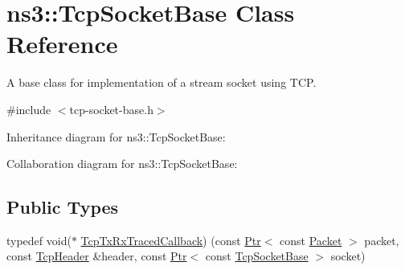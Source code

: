 \hypertarget{classns3_1_1TcpSocketBase}{}\section{ns3\+:\+:Tcp\+Socket\+Base Class Reference}
\label{classns3_1_1TcpSocketBase}


A base class for implementation of a stream socket using T\+CP.  




{\ttfamily \#include $<$tcp-\/socket-\/base.\+h$>$}



Inheritance diagram for ns3\+:\+:Tcp\+Socket\+Base\+:


Collaboration diagram for ns3\+:\+:Tcp\+Socket\+Base\+:
\subsection*{Public Types}
\begin{DoxyCompactItemize}
\item 
typedef void($\ast$ \hyperlink{classns3_1_1TcpSocketBase_adf72372176d8a74b77ddc5a54db02048}{Tcp\+Tx\+Rx\+Traced\+Callback}) (const \hyperlink{classns3_1_1Ptr}{Ptr}$<$ const \hyperlink{classns3_1_1Packet}{Packet} $>$ packet, const \hyperlink{classns3_1_1TcpHeader}{Tcp\+Header} \&header, const \hyperlink{classns3_1_1Ptr}{Ptr}$<$ const \hyperlink{classns3_1_1TcpSocketBase}{Tcp\+Socket\+Base} $>$ socket)
\end{DoxyCompactItemize}
